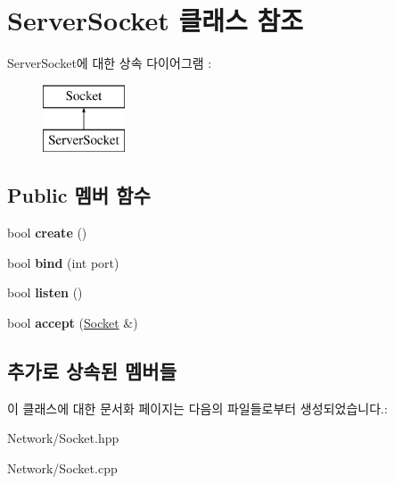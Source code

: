\hypertarget{class_server_socket}{}\section{Server\+Socket 클래스 참조}
\label{class_server_socket}
Server\+Socket에 대한 상속 다이어그램 \+: \begin{figure}[H]
\begin{center}
\leavevmode
\includegraphics[height=2.000000cm]{class_server_socket}
\end{center}
\end{figure}
\subsection*{Public 멤버 함수}
\begin{DoxyCompactItemize}
\item 
\mbox{\label{class_server_socket_ae35fa343500190589a940b537cd2d5ad}} 
bool {\bfseries create} ()
\item 
\mbox{\label{class_server_socket_a63785b98719be87f68810d8a506913a8}} 
bool {\bfseries bind} (int port)
\item 
\mbox{\label{class_server_socket_a5579ff472927404abb1bba3ec392a88d}} 
bool {\bfseries listen} ()
\item 
\mbox{\label{class_server_socket_a12c7b51e437207f69de17027dc001fc7}} 
bool {\bfseries accept} (\hyperlink{class_socket}{Socket} \&)
\end{DoxyCompactItemize}
\subsection*{추가로 상속된 멤버들}


이 클래스에 대한 문서화 페이지는 다음의 파일들로부터 생성되었습니다.\+:\begin{DoxyCompactItemize}
\item 
Network/Socket.\+hpp\item 
Network/Socket.\+cpp\end{DoxyCompactItemize}
